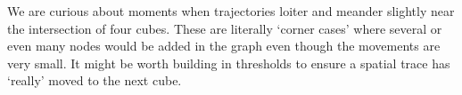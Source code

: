 We are curious about moments when trajectories loiter and meander slightly near the intersection of four cubes.
These are literally `corner cases' where several or even many nodes would be added in the graph even though the movements are very small.
It might be worth building in thresholds to ensure a spatial trace has `really' moved to the next cube.



